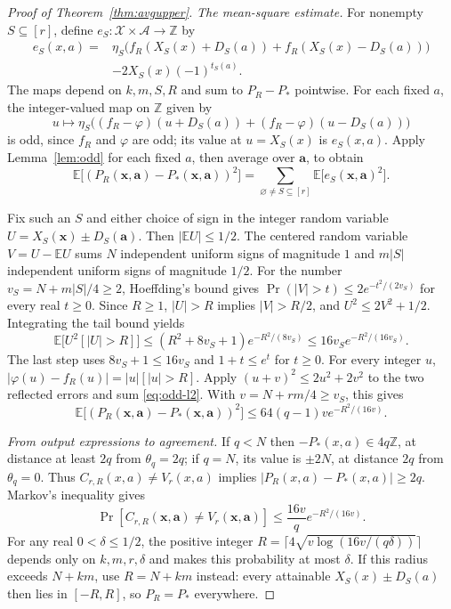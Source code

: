 \documentclass[11pt]{article}
\begin{document}
\begin{proof}[Proof of Theorem~\ref{thm:avgupper}]
\emph{The mean-square estimate.}
For nonempty $S\subseteq[r]$, define $e_S:\mathcal X\times\mathcal A\to\mathbb Z$ by
\begin{align*}
e_S(x,a)={}&\eta_S\bigl(f_R(X_S(x)+D_S(a))+f_R(X_S(x)-D_S(a))\bigr)\\
&-2X_S(x)(-1)^{t_S(a)}.
\end{align*}
The maps depend on $k,m,S,R$ and sum to $P_R-P_*$ pointwise.
For each fixed $a$, the integer-valued map on $\mathbb Z$ given by
$$u\mapsto\eta_S\bigl((f_R-\varphi)(u+D_S(a))
                         +(f_R-\varphi)(u-D_S(a))\bigr)$$
is odd, since $f_R$ and $\varphi$ are odd; its value at $u=X_S(x)$
is $e_S(x,a)$. Apply Lemma~\ref{lem:odd} for each fixed $a$, then average
over $\boldsymbol a$, to obtain
\begin{equation}\label{eq:odd-l2}
\mathbb E\bigl[(P_R(\boldsymbol{x},\boldsymbol{a})-P_*(\boldsymbol{x},\boldsymbol{a}))^2\bigr]
 =\sum_{\varnothing\ne S\subseteq[r]}\mathbb E\bigl[e_S(\boldsymbol{x},\boldsymbol{a})^2\bigr].
\end{equation}

Fix such an $S$ and either choice of sign in the integer random variable
$U=X_S(\boldsymbol{x})\pm D_S(\boldsymbol{a})$.
Then $|\mathbb EU|\le1/2$. The centered random variable
$V=U-\mathbb EU$ sums $N$ independent uniform signs of magnitude $1$
and $m|S|$ independent uniform signs of magnitude $1/2$.
For the number $v_S=N+m|S|/4\ge2$, Hoeffding's bound gives
$\Pr(|V|>t)\le2e^{-t^2/(2v_S)}$ for every real $t\ge0$.
Since $R\ge1$, $|U|>R$ implies $|V|>R/2$, and $U^2\le2V^2+1/2$.
Integrating the tail bound yields
$$
\mathbb E\bigl[U^2[|U|>R]\bigr]
 \le(R^2+8v_S+1)e^{-R^2/(8v_S)}
 \le16v_Se^{-R^2/(16v_S)}.
$$
The last step uses $8v_S+1\le16v_S$ and $1+t\le e^t$ for $t\ge0$.
For every integer $u$, $|\varphi(u)-f_R(u)|=|u|[|u|>R]$.
Apply $(u+v)^2\le2u^2+2v^2$ to the two reflected errors and sum
\eqref{eq:odd-l2}. With $v=N+rm/4\ge v_S$, this gives
$$
\mathbb E\bigl[(P_R(\boldsymbol{x},\boldsymbol{a})-P_*(\boldsymbol{x},\boldsymbol{a}))^2\bigr]
 \le64(q-1)v e^{-R^2/(16v)}.
$$

\emph{From output expressions to agreement.}
If $q<N$ then $-P_*(x,a)\in4q\mathbb Z$, at distance
at least $2q$ from $\theta_q=2q$; if $q=N$, its value is $\pm2N$, at
distance $2q$ from $\theta_q=0$.
Thus $C_{r,R}(x,a)\ne V_r(x,a)$ implies
$|P_R(x,a)-P_*(x,a)|\ge2q$. Markov's inequality gives
$$\Pr[C_{r,R}(\boldsymbol{x},\boldsymbol{a})\ne V_r(\boldsymbol{x},\boldsymbol{a})]
 \le\frac{16v}{q}e^{-R^2/(16v)}.$$
For any real $0<\delta\le1/2$, the positive integer
$R=\lceil4\sqrt{v\log(16v/(q\delta))}\rceil$
depends only on $k,m,r,\delta$ and makes this probability at most $\delta$.
If this radius exceeds $N+km$, use $R=N+km$ instead: every attainable
$X_S(x)\pm D_S(a)$ then lies in $[-R,R]$, so $P_R=P_*$ everywhere.


\end{proof}
\end{document}
